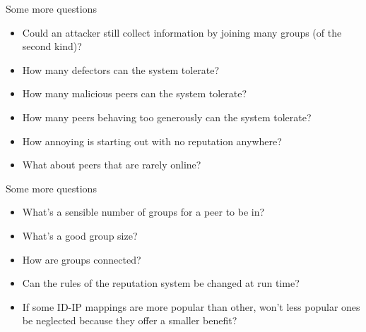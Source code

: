 \documentclass[presentation,english]{beamer}
\begin{document}
\begin{frame}{Some more questions}
  \begin{itemize}
    \item Could an attacker still collect information by joining many groups (of
          the second kind)?
    \item How many defectors can the system tolerate?
    \item How many malicious peers can the system tolerate?
    \item How many peers behaving too generously can the system tolerate?
    \item How annoying is starting out with no reputation anywhere?
    \item What about peers that are rarely online?
  \end{itemize}
\end{frame}

\begin{frame}{Some more questions}
  \begin{itemize}
    \item What's a sensible number of groups for a peer to be in?
    \item What's a good group size?
    \item How are groups connected?
    \item Can the rules of the reputation system be changed at run time?
    \item If some ID-IP mappings are more popular than other, won't less popular
          ones be neglected because they offer a smaller benefit?
  \end{itemize}
\end{frame}
\end{document}
